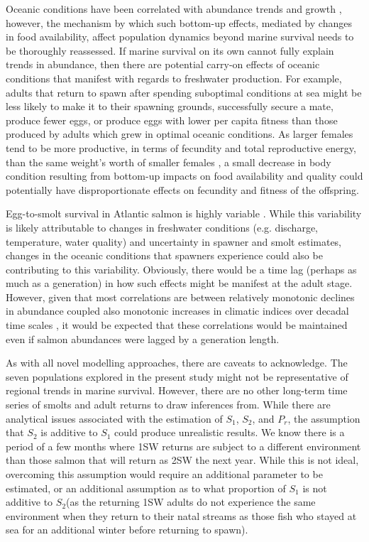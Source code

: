 \documentclass[12pt]{article}
\newcommand{\So}{$S_{1}$\xspace}
\newcommand{\St}{$S_{2}$\xspace}
\newcommand{\Pg}{$P_r$\xspace}
\begin{document}
Oceanic conditions have been correlated with abundance trends and growth
\citep{Todd2008}, however, the mechanism by which such bottom-up effects,
mediated by changes in food availability,
affect population dynamics beyond marine survival needs to
be thoroughly reassessed. If marine survival on its own cannot fully explain
trends in abundance, then there are potential carry-on effects of oceanic
conditions that manifest with regards to freshwater production. 
For example, adults
that return to spawn after spending suboptimal conditions at sea might be less
likely to make it to their spawning grounds, successfully secure a mate,
produce fewer eggs, or produce eggs with lower per capita fitness than those
produced by adults which grew in optimal oceanic conditions.
As larger females tend to be more productive, in terms of fecundity and total
reproductive energy, than the same weight's worth of smaller females
\citep{Barneche2018}, a small decrease in body condition resulting from bottom-up
impacts on food availability and quality could potentially have
disproportionate effects on fecundity and fitness of the offspring.


Egg-to-smolt survival in Atlantic salmon is highly variable \citep{Klemetsen2003,Chaput2015}.
While this variability is likely attributable to changes in freshwater
conditions (e.g. discharge, temperature, water quality) and uncertainty in
spawner and smolt estimates, 
changes in the oceanic conditions that spawners experience could also be
contributing to this variability.
Obviously, there would be a time lag (perhaps as much as a generation) in how such effects
might be manifest at the adult stage.
However, given that most correlations are between relatively monotonic declines
in abundance coupled also monotonic increases in climatic indices
over decadal time scales \citep[e.g.,][]{Friedland1998, Todd2008,
    Beaugrand2012}, it would be expected that these correlations would be
maintained even if salmon abundances were lagged by a generation length.


As with all novel modelling approaches, there are caveats to acknowledge.
The seven populations explored in the present study might not be representative
of regional trends in marine survival. However, there are no other
long-term time series of smolts and adult returns to draw inferences from.
While there are analytical issues associated with the estimation of \So, \St, and \Pg,
the assumption that \St is additive to \So could produce unrealistic results.
We know there is a period of a few months where 1SW
returns are subject to a different environment than those salmon that will
return as 2SW the next year. 
While this is not ideal,
overcoming this assumption would require an additional parameter to be
estimated, or an additional assumption as to what proportion of \So is not
additive to \St (as the returning 1SW adults do not experience the same
environment when they return to their natal streams as those fish who stayed
at sea for an additional winter before returning to spawn).
\end{document}
